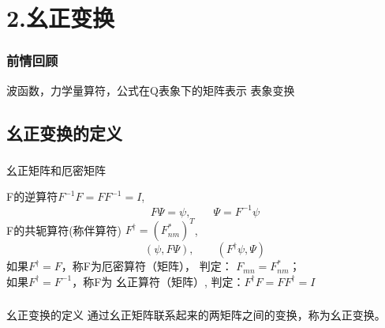 

\section{2.幺正变换}

\begin{frame}
    \frametitle{前情回顾}
    \begin{itemize}
       \done 波函数，力学量算符，公式在Q表象下的矩阵表示 
       \todo 表象变换
    \end{itemize}
\end{frame} 

\subsection{幺正变换的定义}

\begin{frame} 
    \frametitle{}
    \begin{tcolorbox1}{幺正矩阵和厄密矩阵}
        \begin{enumerate}
            \Item F的逆算符$F^{-1}F=FF^{-1}=I$, $$F\Psi=\psi, \qquad \Psi=F^{-1}\psi$$  
            \Item F的共轭算符(称伴算符) $F^{\dagger}=(F_{nm} ^*)^T$, $$ (\psi, F\Psi), \qquad (F^{\dagger}\psi, \Psi)$$
            如果$F^{\dagger } =F$，称F为{\color{red}厄密算符（矩阵）}， 
            判定： $F_{mn}=F_{nm} ^*$； 
            \\ 如果$ F^{\dagger }=F^{-1}$，称F为{\color{red} 幺正算符（矩阵）}, 判定：$F^{\dagger} F= FF^{\dagger}=I$
        \end{enumerate}       
    \end{tcolorbox1}
\end{frame}

\begin{frame} 
    \frametitle{}
    \begin{tcolorbox1}{幺正变换的定义}
    通过幺正矩阵联系起来的两矩阵之间的变换，称为幺正变换。
    \end{tcolorbox1}
\end{frame}

